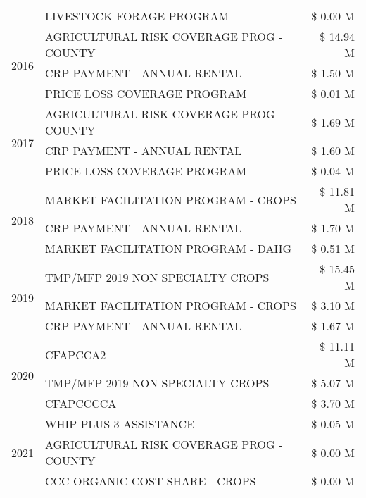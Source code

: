 \begin{tabular}{llr}
 & LIVESTOCK FORAGE PROGRAM & \$ 0.00 M \\
\cline{1-3}
\multirow[t]{3}{*}{2016} & AGRICULTURAL RISK COVERAGE PROG - COUNTY      & \$ 14.94 M \\
 & CRP PAYMENT - ANNUAL RENTAL                   & \$ 1.50 M \\
 & PRICE LOSS COVERAGE PROGRAM                   & \$ 0.01 M \\
\cline{1-3}
\multirow[t]{3}{*}{2017} & AGRICULTURAL RISK COVERAGE PROG - COUNTY & \$ 1.69 M \\
 & CRP PAYMENT - ANNUAL RENTAL & \$ 1.60 M \\
 & PRICE LOSS COVERAGE PROGRAM & \$ 0.04 M \\
\cline{1-3}
\multirow[t]{3}{*}{2018} & MARKET FACILITATION PROGRAM - CROPS & \$ 11.81 M \\
 & CRP PAYMENT - ANNUAL RENTAL & \$ 1.70 M \\
 & MARKET FACILITATION PROGRAM - DAHG & \$ 0.51 M \\
\cline{1-3}
\multirow[t]{3}{*}{2019} & TMP/MFP 2019 NON SPECIALTY CROPS & \$ 15.45 M \\
 & MARKET FACILITATION PROGRAM - CROPS & \$ 3.10 M \\
 & CRP PAYMENT - ANNUAL RENTAL & \$ 1.67 M \\
\cline{1-3}
\multirow[t]{3}{*}{2020} & CFAPCCA2 & \$ 11.11 M \\
 & TMP/MFP 2019 NON SPECIALTY CROPS & \$ 5.07 M \\
 & CFAPCCCCA & \$ 3.70 M \\
\cline{1-3}
\multirow[t]{3}{*}{2021} & WHIP PLUS 3 ASSISTANCE & \$ 0.05 M \\
 & AGRICULTURAL RISK COVERAGE PROG - COUNTY & \$ 0.00 M \\
 & CCC ORGANIC COST SHARE - CROPS & \$ 0.00 M \\
\cline{1-3}
\bottomrule
\end{tabular}
